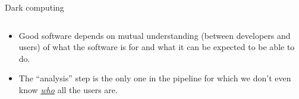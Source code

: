 \documentclass[aspectratio=169]{beamer}
\begin{document}




\begin{frame}{Dark computing}
\vspace{0.25 cm}
\begin{columns}
\end{columns}

\vspace{0.5 cm}
\begin{itemize}
\item<3-> Good software depends on mutual understanding (between developers and users) of what the software is for and what it can be expected to be able to do.
\item<4-> The ``analysis'' step is the only one in the pipeline for which we don't even know \underline{\it who} all the users are.
\end{itemize}
\end{frame}
\end{document}
